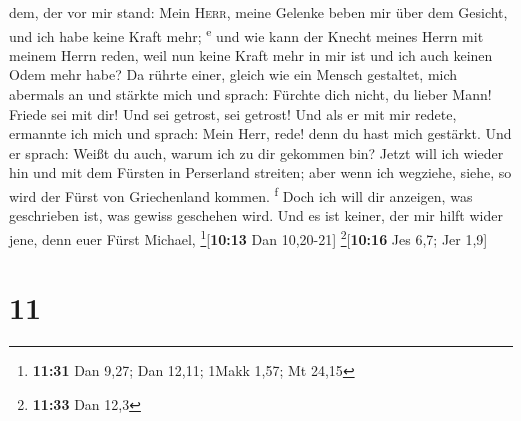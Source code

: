 dem, der vor mir stand: Mein \textsc{Herr}, meine Gelenke beben mir über
dem Gesicht, und ich habe keine Kraft mehr; \textsuperscript{e}
 und wie kann der Knecht meines Herrn mit meinem Herrn
reden, weil nun keine Kraft mehr in mir ist und ich auch keinen Odem
mehr habe?  Da rührte einer, gleich wie ein Mensch
gestaltet, mich abermals an und stärkte mich  und sprach:
Fürchte dich nicht, du lieber Mann! Friede sei mit dir! Und sei getrost,
sei getrost! Und als er mit mir redete, ermannte ich mich und sprach:
Mein Herr, rede! denn du hast mich gestärkt.  Und er
sprach: Weißt du auch, warum ich zu dir gekommen bin? Jetzt will ich
wieder hin und mit dem Fürsten in Perserland streiten; aber wenn ich
wegziehe, siehe, so wird der Fürst von Griechenland kommen.
\textsuperscript{f}  Doch ich will dir anzeigen, was
geschrieben ist, was gewiss geschehen wird. Und es ist keiner, der mir
hilft wider jene, denn euer Fürst Michael, \footnote{\textbf{11:31} Dan
  9,27; Dan 12,11; 1Makk 1,57; Mt 24,15}{[}\textbf{10:13} Dan
10,20-21{]} \footnote{\textbf{11:33} Dan 12,3}{[}\textbf{10:16} Jes 6,7;
Jer 1,9{]}

\hypertarget{section-10}{%
\section{11}\label{section-10}}

